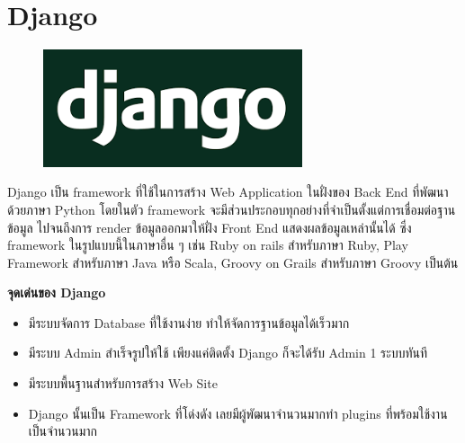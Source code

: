 \section{Django}
\label{Django}
\begin{figure}[!thb]
	\captionsetup{justification=centering}
	\centering
	\includegraphics[width=3in]{latex/figures/django.png}
	\label{fig:django}
\end{figure}
Django เป็น framework ที่ใช้ในการสร้าง Web Application ในฝั่งของ Back End ที่พัฒนาด้วยภาษา Python โดยในตัว framework จะมีส่วนประกอบทุกอย่างที่จำเป็นตั้งแต่การเชื่อมต่อฐานข้อมูล ไปจนถึงการ render ข้อมูลออกมาให้ฝั่ง Front End แสดงผลข้อมูลเหล่านั้นได้ ซึ่ง framework ในรูปแบบนี้ในภาษาอื่น ๆ เช่น Ruby on rails สำหรับภาษา Ruby, Play Framework สำหรับภาษา Java หรือ Scala, Groovy on Grails สำหรับภาษา Groovy เป็นต้น

\begin{flushleft}
	\textbf{จุดเด่นของ Django}
\end{flushleft}
\begin{itemize}
	\item มีระบบจัดการ Database ที่ใช้งานง่าย ทำให้จัดการฐานข้อมูลได้เร็วมาก
	\item มีระบบ Admin สำเร็จรูปให้ใช้ เพียงแค่ติดตั้ง Django ก็จะได้รับ Admin 1 ระบบทันที
	\item มีระบบพื้นฐานสำหรับการสร้าง Web Site
	\item Django นั้นเป็น Framework ที่โด่งดัง เลยมีผู้พัฒนาจำนวนมากทำ plugins ที่พร้อมใช้งานเป็นจำนวนมาก
\end{itemize}

